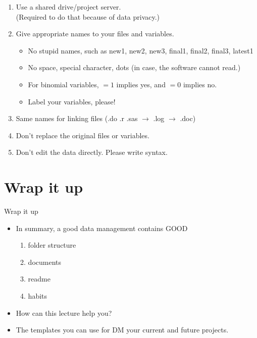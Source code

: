 \begin{frame}{\secname}

\begin{enumerate}
	\item<1|handout:1->  Use a shared drive/project server. \\ (Required to do that because of data privacy.)
	\item<2|handout:2->  Give appropriate names to your files and variables.
		\begin{itemize}
			\item<3|handout:3->  No stupid names, such as new1, new2, new3, final1, final2, final3, latest1
			\item<4|handout:4->  No space, special character, dots (in case, the software cannot read.)
			\item<5|handout:5->  For binomial variables, $=1$ implies yes, and $=0$ implies no.
			\item<6|handout:6->  Label your variables, please!
		\end{itemize}
	\item<7|handout:7->  Same names for linking files (.do .r .sas $\rightarrow$ .log $\rightarrow$ .doc)
	\item<8|handout:8->  Don't replace the original files or variables.
	\item<9|handout:9>  Don't edit the data directly. Please write syntax.

\end{enumerate}
	
\end{frame}


\section{Wrap it up}
\begin{frame}{Wrap it up}
\begin{itemize}
\item<1|handout:1->  In summary, a good data management contains GOOD
\begin{enumerate}
	\item folder structure
	\item documents
	\item readme
	\item habits
\end{enumerate}

\item<2|handout:2>  How can this lecture help you? \\
\item<2|handout:2>  The templates you can use for DM your current and future projects.
\end{itemize}
\end{frame}

